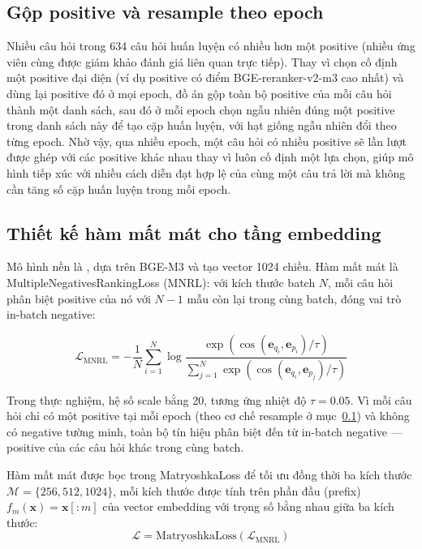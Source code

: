 \documentclass[../DoAn.tex]{subfiles}
\begin{document}
\subsection{Gộp positive và resample theo epoch}
\label{subsection:3.7.2}

Nhiều câu hỏi trong 634 câu hỏi huấn luyện có nhiều hơn một positive (nhiều ứng viên cùng được giám khảo đánh giá liên quan trực tiếp). Thay vì chọn cố định một positive đại diện (ví dụ positive có điểm BGE-reranker-v2-m3 cao nhất) và dùng lại positive đó ở mọi epoch, đồ án gộp toàn bộ positive của mỗi câu hỏi thành một danh sách, sau đó ở mỗi epoch chọn ngẫu nhiên đúng một positive trong danh sách này để tạo cặp huấn luyện, với hạt giống ngẫu nhiên đổi theo từng epoch. Nhờ vậy, qua nhiều epoch, một câu hỏi có nhiều positive sẽ lần lượt được ghép với các positive khác nhau thay vì luôn cố định một lựa chọn, giúp mô hình tiếp xúc với nhiều cách diễn đạt hợp lệ của cùng một câu trả lời mà không cần tăng số cặp huấn luyện trong mỗi epoch.

\subsection{Thiết kế hàm mất mát cho tầng embedding}
\label{subsection:3.7.3}

Mô hình nền là , dựa trên BGE-M3 và tạo vector 1024 chiều. Hàm mất mát là MultipleNegativesRankingLoss (MNRL): với kích thước batch $N$, mỗi câu hỏi phân biệt positive của nó với $N-1$ mẫu còn lại trong cùng batch, đóng vai trò in-batch negative:

\[
\mathcal{L}_{\text{MNRL}}
=
-\frac{1}{N}
\sum_{i=1}^{N}
\log
\frac{
\exp\left(\cos(\mathbf{e}_{q_i},\mathbf{e}_{p_i})/\tau\right)
}{
\sum_{j=1}^{N}
\exp\left(\cos(\mathbf{e}_{q_i},\mathbf{e}_{p_j})/\tau\right)
}
\]

Trong thực nghiệm, hệ số scale bằng 20, tương ứng nhiệt độ $\tau=0.05$. Vì mỗi câu hỏi chỉ có một positive tại mỗi epoch (theo cơ chế resample ở mục~\ref{subsection:3.7.2}) và không có negative tường minh, toàn bộ tín hiệu phân biệt đến từ in-batch negative --- positive của các câu hỏi khác trong cùng batch.

Hàm mất mát được bọc trong MatryoshkaLoss để tối ưu đồng thời ba kích thước $\mathcal{M}=\{256,512,1024\}$, mỗi kích thước được tính trên phần đầu (prefix) $f_m(\mathbf{x})=\mathbf{x}[:m]$ của vector embedding với trọng số bằng nhau giữa ba kích thước:
\[
\mathcal{L} = \text{MatryoshkaLoss}\!\left(\mathcal{L}_{\text{MNRL}}\right)
\]
\end{document}
